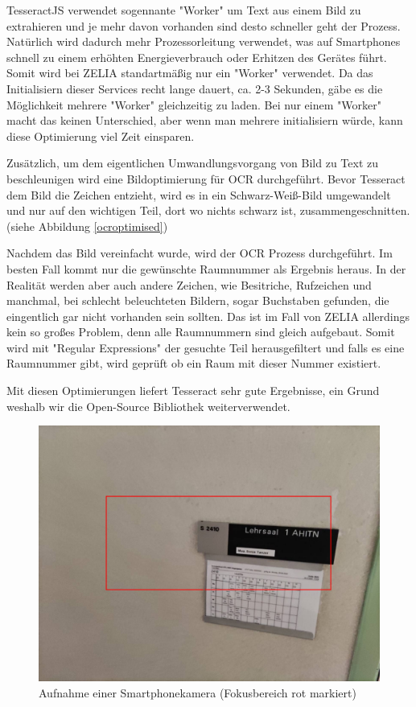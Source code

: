 
TesseractJS verwendet sogennante "Worker" um Text aus einem Bild zu extrahieren und je mehr davon vorhanden sind desto schneller geht der Prozess. Natürlich wird dadurch mehr Prozessorleitung verwendet, was auf Smartphones schnell zu einem erhöhten Energieverbrauch oder Erhitzen des Gerätes führt. Somit wird bei ZELIA standartmäßig nur ein "Worker" verwendet. Da das Initialisiern dieser Services recht lange dauert, ca. 2-3 Sekunden, gäbe es die Möglichkeit mehrere "Worker" gleichzeitig zu laden. Bei nur einem "Worker" macht das keinen Unterschied, aber wenn man mehrere initialisiern würde, kann diese Optimierung viel Zeit einsparen.

Zusätzlich, um dem eigentlichen Umwandlungsvorgang von Bild zu Text zu beschleunigen wird eine Bildoptimierung für OCR durchgeführt. Bevor Tesseract dem Bild die Zeichen entzieht, wird es in ein Schwarz-Weiß-Bild umgewandelt und nur auf den wichtigen Teil, dort wo nichts schwarz ist, zusammengeschnitten. (siehe Abbildung \ref{ocroptimised})

Nachdem das Bild vereinfacht wurde, wird der OCR Prozess durchgeführt. Im besten Fall kommt nur die gewünschte Raumnummer als Ergebnis heraus. In der Realität werden aber auch andere Zeichen, wie Besitriche, Rufzeichen und manchmal, bei schlecht beleuchteten Bildern, sogar Buchstaben gefunden, die eingentlich gar nicht vorhanden sein sollten. Das ist im Fall von ZELIA allerdings kein so großes Problem, denn alle Raumnummern sind gleich aufgebaut. Somit wird mit "Regular Expressions" der gesuchte Teil herausgefiltert und falls es eine Raumnummer gibt, wird geprüft ob ein Raum mit dieser Nummer existiert.

Mit diesen Optimierungen liefert Tesseract sehr gute Ergebnisse, ein Grund weshalb wir die Open-Source Bibliothek weiterverwendet.


\begin{figure}
    \centering
    \includegraphics[width=120mm]{media/OCR/original}
    \caption{Aufnahme einer Smartphonekamera (Fokusbereich rot markiert)}
    \label{fig:phonecam}
\end{figure}


